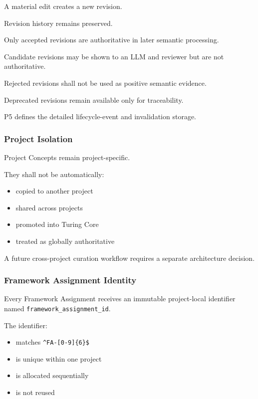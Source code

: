 A material edit creates a new revision.

Revision history remains preserved.

Only accepted revisions are authoritative in later semantic processing.

Candidate revisions may be shown to an LLM and reviewer but are not authoritative.

Rejected revisions shall not be used as positive semantic evidence.

Deprecated revisions remain available only for traceability.

P5 defines the detailed lifecycle-event and invalidation storage.

\hypertarget{project-isolation}{%
\subsubsection{Project Isolation}\label{project-isolation}}

Project Concepts remain project-specific.

They shall not be automatically:

\begin{itemize}
\tightlist
\item
  copied to another project
\item
  shared across projects
\item
  promoted into Turing Core
\item
  treated as globally authoritative
\end{itemize}

A future cross-project curation workflow requires a separate architecture decision.

\hypertarget{framework-assignment-identity}{%
\subsubsection{Framework Assignment Identity}\label{framework-assignment-identity}}

Every Framework Assignment receives an immutable project-local identifier named \texttt{framework\_assignment\_id}.

The identifier:

\begin{itemize}
\tightlist
\item
  matches \texttt{\^{}FA-{[}0-9{]}\{6\}\$}
\item
  is unique within one project
\item
  is allocated sequentially
\item
  is not reused
\end{itemize}

